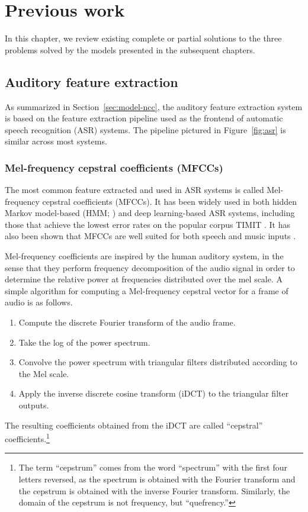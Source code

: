 \chapter{Previous work}
\label{chapt:previouswork}

In this chapter, we review
existing complete or partial solutions
to the three problems
solved by the models
presented in the subsequent chapters.

\section{Auditory feature extraction}

As summarized in Section~\ref{sec:model-ncc},
the auditory feature extraction system
is based on the feature extraction pipeline
used as the frontend
of automatic speech recognition (ASR) systems.
The pipeline pictured in Figure~\ref{fig:asr}
is similar across most systems.

\subsection{Mel-frequency cepstral coefficients (MFCCs)}
\label{sec:prev-mfcc}

The most common feature extracted
and used in ASR systems
is called Mel-frequency cepstral coefficients (MFCCs).
It has been widely used
in both hidden Markov model-based
(HMM; \citealp{hain1999,gales2008,gaikwad2010,alam2013})
and deep learning-based
\citep{graves2006,graves2008,fernandez2008} ASR systems,
including those that achieve
the lowest error rates
on the popular corpus TIMIT
\citep{garofolo1993,lopes2011}.
It has also been shown that
MFCCs are well suited
for both speech and music inputs
\citep{logan2000}.

Mel-frequency coefficients are inspired
by the human auditory system,
in the sense that they perform
frequency decomposition
of the audio signal
in order to determine the relative power
at frequencies distributed over the mel scale.
A simple algorithm for computing a
Mel-frequency cepstral vector
for a frame of audio is as follows.

\begin{enumerate}
  \item Compute the discrete Fourier transform
    of the audio frame.
  \item Take the log of the power spectrum.
  \item Convolve the power spectrum
    with triangular filters distributed
    according to the Mel scale.
  \item Apply the inverse discrete cosine transform (iDCT)
    to the triangular filter outputs.
\end{enumerate}
The resulting coefficients obtained from
the iDCT are called ``cepstral'' coefficients.\footnote{
  The term ``cepstrum'' comes from
  the word ``spectrum'' with the first four letters reversed,
  as the spectrum is obtained with the Fourier transform
  and the cepstrum is obtained with the inverse Fourier transform.
  Similarly, the domain of the cepstrum is not frequency,
  but ``quefrency.''}


